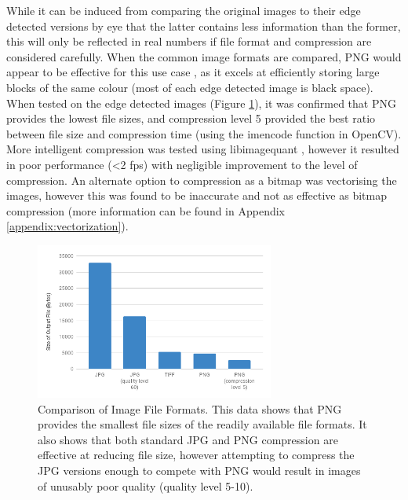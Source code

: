 While it can be induced from comparing the original images to their edge detected versions by eye that the latter contains less information than the former, this will only be reflected in real numbers if file format and compression are considered carefully. When the common image formats are compared, PNG would appear to be effective for this use case \cite{aguilera2006comparison}, as it excels at efficiently storing large blocks of the same colour (most of each edge detected image is black space). When tested on the edge detected images (Figure \ref{fig:compress}), it was confirmed that PNG provides the lowest file sizes, and compression level 5 provided the best ratio between file size and compression time (using the imencode function in OpenCV). More intelligent compression was tested using libimagequant \cite{libimagequant}, however it resulted in poor performance (\textless2 fps) with negligible improvement to the level of compression. An alternate option to compression as a bitmap was vectorising the images, however this was found to be inaccurate and not as effective as bitmap compression (more information can be found in Appendix \ref{appendix:vectorization}).

\begin{figure}[H]
    \begin{center}
      \includegraphics[width=0.7\textwidth]{Figures/compression.png}
      \caption[Comparison of Image File Formats]{Comparison of Image File Formats. This data shows that PNG provides the smallest file sizes of the readily available file formats. It also shows that both standard JPG and PNG compression are effective at reducing file size, however attempting to compress the JPG versions enough to compete with PNG would result in images of unusably poor quality (quality level 5-10).}
      \label{fig:compress}
    \end{center}
\end{figure}

